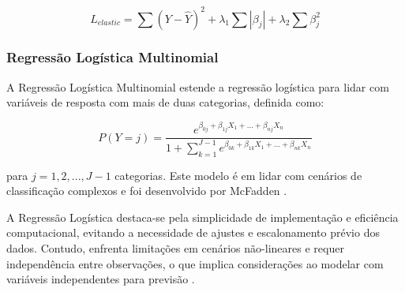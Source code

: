\begin{equation}
L_{elastic} = \sum (Y - \hat{Y})^2 + \lambda_1\sum |\beta_j| + \lambda_2\sum \beta_j^2
\end{equation}

\subsubsection{Regressão Logística Multinomial}

A Regressão Logística Multinomial estende a regressão logística para lidar com variáveis de resposta com mais de duas categorias, definida como:

\[ P(Y=j) = \frac{e^{\beta_{0j} + \beta_{1j}X_1 + ... + \beta_{nj}X_n}}{1 + \sum_{k=1}^{J-1} e^{\beta_{0k} + \beta_{1k}X_1 + ... + \beta_{nk}X_n}} \]

para \(j = 1, 2, ..., J-1\) categorias. Este modelo é em lidar com cenários de classificação complexos e foi desenvolvido por McFadden \cite{mcfadden1973conditional}.

A Regressão Logística destaca-se pela simplicidade de implementação e eficiência computacional, evitando a necessidade de ajustes e escalonamento prévio dos dados. Contudo, enfrenta limitações em cenários não-lineares e requer independência entre observações, o que implica considerações ao modelar com variáveis independentes para previsão \cite{kowsari2019text}.





